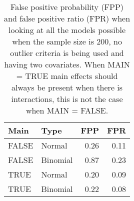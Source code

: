 \begin{longtable}{llrr}
\caption{False positive probability (FPP) and false positive ratio (FPR) when looking at all the models possible when the sample size is 200, no outlier criteria is being used and having two covariates. When MAIN = TRUE main effects should always be present when there is interactions, this is not the case when MAIN = FALSE. } \\ 
  \hline
Main & Type & FPP & FPR \\ 
  \hline
FALSE & Normal & 0.26 & 0.11 \\ 
  FALSE & Binomial & 0.87 & 0.23 \\ 
  TRUE & Normal & 0.20 & 0.09 \\ 
  TRUE & Binomial & 0.22 & 0.08 \\ 
   \hline
\hline
\end{longtable}
